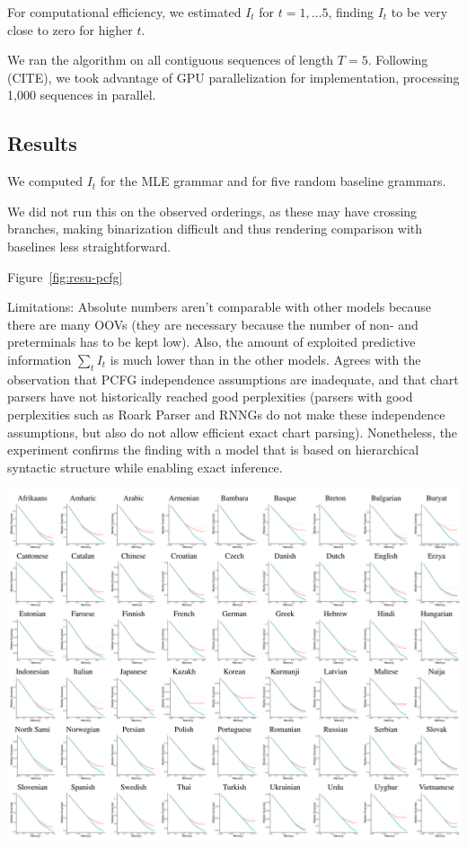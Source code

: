 \documentclass[11pt,letterpaper]{article}
\begin{document}
For computational efficiency, we estimated $I_t$ for $t=1, \dots 5$, finding $I_t$ to be very close to zero for higher $t$.

We ran the algorithm on all contiguous sequences of length $T=5$.
Following (CITE), we took advantage of GPU parallelization for implementation, processing 1,000 sequences in parallel.


\subsection{Results}
We computed $I_t$ for the MLE grammar and for five random baseline grammars.

We did not run this on the observed orderings, as these may have crossing branches, making binarization difficult and thus rendering comparison with baselines less straightforward.

Figure~\ref{fig:resu-pcfg}

Limitations: Absolute numbers aren't comparable with other models because there are many OOVs (they are necessary because the number of non- and preterminals has to be kept low).
Also, the amount of exploited predictive information $\sum_t I_t$ is much lower than in the other models. Agrees with the observation that PCFG independence assumptions are inadequate, and that chart parsers have not historically reached good perplexities (parsers with good perplexities such as Roark Parser and RNNGs do not make these independence assumptions, but also do not allow efficient exact chart parsing).
Nonetheless, the experiment confirms the finding with a model that is based on hierarchical syntactic structure while enabling exact inference.

\begin{center}
\includegraphics[width=\textwidth]{results-table-pcfg.pdf}
\label{fig:resu-pcfg}
\end{center}
\end{document}
